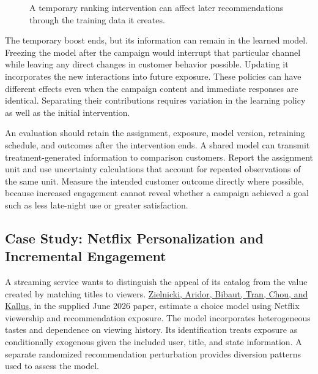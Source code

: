 \begin{figure}[htbp]
\centering

\caption{A temporary ranking intervention can affect later recommendations through the training data it creates.}\label{fig:M08_policy_horizon}
\end{figure}

The temporary boost ends, but its information can remain in the learned
model. Freezing the model after the campaign would interrupt that
particular channel while leaving any direct changes in customer behavior
possible. Updating it incorporates the new interactions into future
exposure. These policies can have different effects even when the
campaign content and immediate responses are identical. Separating their
contributions requires variation in the learning policy as well as the
initial intervention.

An evaluation should retain the assignment, exposure, model version,
retraining schedule, and outcomes after the intervention ends. A shared
model can transmit treatment-generated information to comparison
customers. Report the assignment unit and use uncertainty calculations
that account for repeated observations of the same unit. Measure the
intended customer outcome directly where possible, because increased
engagement cannot reveal whether a campaign achieved a goal such as less
late-night use or greater satisfaction.

\hypertarget{M08-case-study-netflix-personalization-and-incremental-engagement}{%
\subsection{Case Study: Netflix Personalization and Incremental
Engagement}\label{M08-case-study-netflix-personalization-and-incremental-engagement}}

\noindent A streaming service wants to distinguish the appeal of its catalog from
the value created by matching titles to viewers.
\href{https://www.ifo.de/en/cesifo/publications/2026/working-paper/value-personalized-recommendations-evidence-netflix}{Zielnicki,
Aridor, Bibaut, Tran, Chou, and Kallus}, in the supplied June 2026
paper, estimate a choice model using Netflix viewership and
recommendation exposure. The model incorporates heterogeneous tastes and
dependence on viewing history. Its identification treats exposure as
conditionally exogenous given the included user, title, and state
information. A separate randomized recommendation perturbation provides
diversion patterns used to assess the model.

